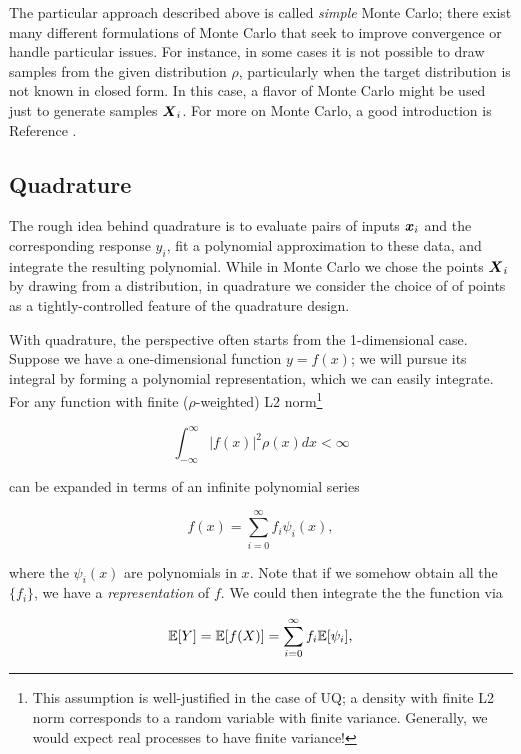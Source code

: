 \documentclass[../primer.tex]{subfiles}
\begin{document}
The particular approach described above is called \emph{simple} Monte Carlo;
there exist many different formulations of Monte Carlo that seek to improve
convergence or handle particular issues. For instance, in some cases it is not
possible to draw samples from the given distribution $\rho$, particularly when
the target distribution is not known in closed form. In this case, a flavor of
Monte Carlo might be used just to generate samples $\boldsymbol{X}_i$. For more on Monte
Carlo, a good introduction is Reference \cite{owen2013montecarlo}.

\subsection{Quadrature}
The rough idea behind quadrature is to evaluate pairs of inputs $\boldsymbol{x}_i$ and the
corresponding response $y_i$, fit a polynomial approximation to these data, and
integrate the resulting polynomial. While in Monte Carlo we chose the points
$\boldsymbol{X}_i$ by drawing from a distribution, in quadrature we consider the choice of
of points as a tightly-controlled feature of the quadrature design.

With quadrature, the perspective often starts from the 1-dimensional case.
Suppose we have a one-dimensional function $y = f(x)$; we will pursue its
integral by forming a polynomial representation, which we can easily integrate.
For any function with finite ($\rho$-weighted) L2 norm\footnote{This assumption
  is well-justified in the case of UQ; a density with finite L2 norm corresponds
  to a random variable with finite variance. Generally, we would expect real
  processes to have finite variance!}

\begin{equation}
  \int_{-\infty}^{\infty} |f(x)|^2 \rho(x) dx < \infty
\end{equation}

\noindent can be expanded in terms of an infinite polynomial series

\begin{equation} \label{eq:poly-expansion}
  f(x) = \sum_{i=0}^{\infty} f_i \psi_i(x),
\end{equation}

\noindent where the $\psi_i(x)$ are polynomials in
$x$.\cite{cameron1947orthogonal} Note that if we somehow obtain all the
$\{f_i\}$, we have a \emph{representation} of $f$. We could then integrate the
the function via

\begin{equation}
  \mathbb{E}[Y] = \mathbb{E}[f(X)] = \sum_{i=0}^{\infty} f_i \mathbb{E}[\psi_i],
\end{equation}
\end{document}
